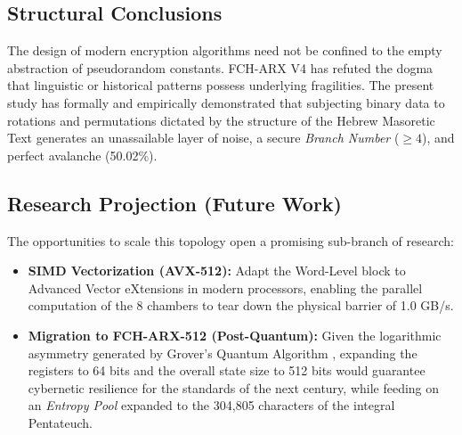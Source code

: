\documentclass[10pt,journal,compsoc]{IEEEtran}
\begin{document}
\subsection{Structural Conclusions}
The design of modern encryption algorithms need not be confined to the empty abstraction of pseudorandom constants. FCH-ARX V4 has refuted the dogma that linguistic or historical patterns possess underlying fragilities. The present study has formally and empirically demonstrated that subjecting binary data to rotations and permutations dictated by the structure of the Hebrew Masoretic Text generates an unassailable layer of noise, a secure \textit{Branch Number} ($\ge 4$), and perfect avalanche (50.02\%).

\subsection{Research Projection (Future Work)}
The opportunities to scale this topology open a promising sub-branch of research:
\begin{itemize}
    \item \textbf{SIMD Vectorization (AVX-512):} Adapt the Word-Level block to Advanced Vector eXtensions in modern processors, enabling the parallel computation of the 8 chambers to tear down the physical barrier of 1.0 GB/s.
    \item \textbf{Migration to FCH-ARX-512 (Post-Quantum):} Given the logarithmic asymmetry generated by Grover's Quantum Algorithm \cite{grover1996fast}, expanding the registers to 64 bits and the overall state size to 512 bits would guarantee cybernetic resilience for the standards of the next century, while feeding on an \textit{Entropy Pool} expanded to the 304,805 characters of the integral Pentateuch.
\end{itemize}
\end{document}
